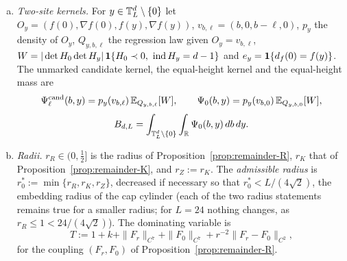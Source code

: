 \begin{convention}
\begin{enumerate}[(a),leftmargin=2em,itemsep=2pt]
\item \emph{Two-site kernels.} For $y\in\mathbb T^d_L\setminus\{0\}$ let $O_y=(f(0),\nabla f(0),f(y),\nabla f(y))$, $v_{b,\ell}=(b,0,b-\ell,0)$, $p_y$ the density of $O_y$, $Q_{y,b,\ell}$ the regression law given $O_y=v_{b,\ell}$, $W=|\det H_0\det H_y|\,\mathbf 1\{H_0\prec0,\ \operatorname{ind} H_y=d-1\}$ and $e_y=\mathbf 1\{d_f(0)=f(y)\}$. The unmarked candidate kernel, the equal-height kernel and the equal-height mass are
\[
\Psi^{\mathrm{cand}}_\ell(b,y)=p_y(v_{b,\ell})\,\mathbb E_{Q_{y,b,\ell}}[W],\qquad \Psi_0(b,y)=p_y(v_{b,0})\,\mathbb E_{Q_{y,b,0}}[W],
\]
\[
B_{d,L}=\int_{\mathbb T^d_L\setminus\{0\}}\int_\mathbb R\Psi_0(b,y)\,db\,dy .
\]
\item \emph{Radii.} $r_R\in(0,\frac12]$ is the radius of Proposition~\ref{prop:remainder-R}, $r_K$ that of Proposition~\ref{prop:remainder-K}, and $r_Z:=r_K$. The \emph{admissible radius} is $r_0^*:=\min\{r_R,r_K,r_Z\}$, decreased if necessary so that $r_0^*<L/(4\sqrt2)$, the embedding radius of the cap cylinder (each of the two radius statements remains true for a smaller radius; for $L=24$ nothing changes, as $r_R\le1<24/(4\sqrt2)$). The dominating variable is
\[
T:=1+k+\|F_r\|_{C^7}+\|F_0\|_{C^7}+r^{-2}\|F_r-F_0\|_{C^2},
\]
for the coupling $(F_r,F_0)$ of Proposition~\ref{prop:remainder-R}.
\end{enumerate}
\end{convention}

